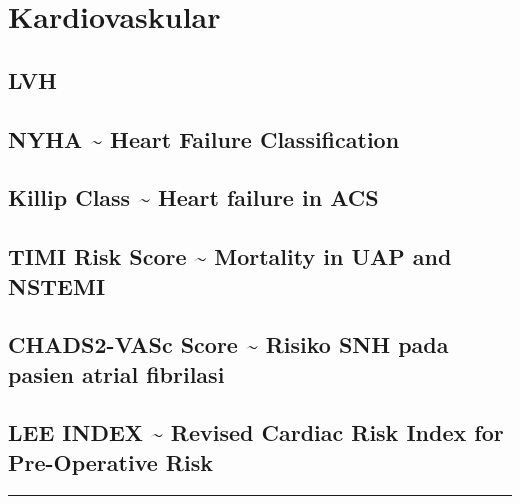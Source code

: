 \documentclass[
]{book}
\begin{document}
\hypertarget{kardiovaskular}{%
\section{Kardiovaskular}\label{kardiovaskular}}

\hypertarget{lvh}{%
\subsection{LVH}\label{lvh}}

\hypertarget{nyha-heart-failure-classification}{%
\subsection{NYHA \textasciitilde{} Heart Failure Classification}\label{nyha-heart-failure-classification}}

\hypertarget{killip-class-heart-failure-in-acs}{%
\subsection{Killip Class \textasciitilde{} Heart failure in ACS}\label{killip-class-heart-failure-in-acs}}

\hypertarget{timi-risk-score-mortality-in-uap-and-nstemi}{%
\subsection{TIMI Risk Score \textasciitilde{} Mortality in UAP and NSTEMI}\label{timi-risk-score-mortality-in-uap-and-nstemi}}

\hypertarget{chads2-vasc-score-risiko-snh-pada-pasien-atrial-fibrilasi}{%
\subsection{CHADS2-VASc Score \textasciitilde{} Risiko SNH pada pasien atrial fibrilasi}\label{chads2-vasc-score-risiko-snh-pada-pasien-atrial-fibrilasi}}

\hypertarget{lee-index-revised-cardiac-risk-index-for-pre-operative-risk}{%
\subsection{LEE INDEX \textasciitilde{} Revised Cardiac Risk Index for Pre-Operative Risk}\label{lee-index-revised-cardiac-risk-index-for-pre-operative-risk}}

\begin{center}\rule{0.5\linewidth}{0.5pt}\end{center}
\end{document}
